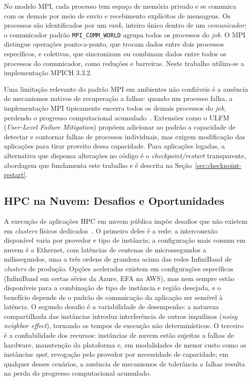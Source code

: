 No modelo MPI, cada processo tem espaço de memória privado e se comunica com os
demais por meio de envio e recebimento explícitos de mensagens. Os processos são
identificados por um \textit{rank}, inteiro único dentro de um \textit{comunicador};
o comunicador padrão \texttt{MPI\_COMM\_WORLD} agrupa todos os processos do
\textit{job}. O MPI distingue operações ponto-a-ponto, que trocam dados entre dois
processos específicos, e coletivas, que sincronizam ou combinam dados entre todos os
processos do comunicador, como reduções e barreiras. Neste trabalho utiliza-se a
implementação MPICH 3.3.2.

Uma limitação relevante do padrão MPI em ambientes não confiáveis é a ausência de
mecanismos nativos de recuperação a falhas: quando um processo falha, a implementação
MPI tipicamente encerra todos os demais processos do \textit{job}, perdendo o progresso
computacional acumulado~\cite{bland2013ulfm}. Extensões como o ULFM
(\textit{User-Level Failure Mitigation}) propõem adicionar ao padrão a capacidade de
detectar e contornar falhas de processos individuais, mas exigem modificação das
aplicações para tirar proveito dessa capacidade. Para aplicações legadas, a alternativa
que dispensa alterações no código é o \textit{checkpoint/restart} transparente,
abordagem que fundamenta este trabalho e é descrita na
Seção~\ref{sec:checkpoint-restart}.

\subsection{HPC na Nuvem: Desafios e Oportunidades}
\label{sec:hpc-nuvem}

A execução de aplicações HPC em nuvem pública impõe desafios que não existem em
\textit{clusters} físicos dedicados~\cite{netto2018hpccloud}. O primeiro deles é a
rede: a interconexão disponível varia por provedor e tipo de instância; a
configuração mais comum em nuvem é a Ethernet, com latências de centenas de
microssegundos a milissegundos, uma a três ordens de grandeza acima das redes
InfiniBand de \textit{clusters} de produção. Opções aceleradas existem em
configurações específicas (InfiniBand em certas séries da Azure, EFA na AWS), mas
nem sempre estão disponíveis para a combinação de tipo de instância e região
desejada, e o benefício depende de o padrão de comunicação da aplicação ser sensível
à latência. O segundo desafio é a variabilidade de desempenho: a natureza
compartilhada das instâncias introduz interferência de outros inquilinos
(\textit{noisy neighbor effect}), tornando os tempos de execução não determinísticos.
O terceiro é a confiabilidade dos recursos: instâncias de nuvem estão sujeitas a
falhas de hardware, manutenção da plataforma e, em modalidades de menor custo como
as instâncias \textit{spot}, revogação pelo provedor por necessidade de capacidade;
em qualquer desses cenários, a ausência de mecanismos de tolerância a falhas resulta
na perda do progresso computacional acumulado.

